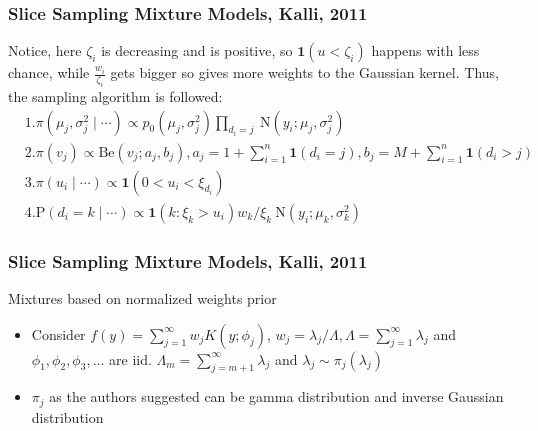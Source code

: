 \documentclass{beamer}
\begin{document}
\begin{frame}
    \frametitle{Slice Sampling Mixture Models, Kalli, 2011}
    Notice, here $\zeta_{i}$ is decreasing and is positive, so $\textbf{1}(u < \zeta_{i})$ happens with less chance, while $\frac{w_i}{\zeta_{i}}$ gets bigger so gives more weights to the Gaussian kernel. Thus, the sampling algorithm is followed:
    $$
    \begin{aligned}
    & 1. \pi\left(\mu_{j}, \sigma_{j}^{2} \mid \cdots\right) \propto p_{0}\left(\mu_{j}, \sigma_{j}^{2}\right) \prod_{d_{i}=j} \mathrm{~N}\left(y_{i} ; \mu_{j}, \sigma_{j}^{2}\right) \\
    & 2. \pi\left(v_{j}\right) \propto \mathrm{Be}\left(v_{j} ; a_{j}, b_{j}\right),  a_{j}=1+\sum_{i=1}^{n} \textbf{1}\left(d_{i}=j\right), b_{j}=M+\sum_{i=1}^{n} \textbf{1}\left(d_{i}>j\right) \\
    & 3. \pi\left(u_{i} \mid \cdots\right) \propto \textbf{1}\left(0<u_{i}<\xi_{d_{i}}\right) \\
    & 4. \mathrm{P}\left(d_{i}=k \mid \cdots\right) \propto \textbf{1}\left(k: \xi_{k}>u_{i}\right) w_{k} / \xi_{k} \mathrm{~N}\left(y_{i} ; \mu_{k}, \sigma_{k}^{2}\right)
    \end{aligned}
    $$
\end{frame}



\begin{frame}
    \frametitle{Slice Sampling Mixture Models, Kalli, 2011}
Mixtures based on normalized weights prior \\
    \begin{itemize}
    \item Consider $f(y)=\sum_{j=1}^{\infty} w_{j} K\left(y ; \phi_{j}\right)$,  $w_{j}=\lambda_{j} / \Lambda, \Lambda=\sum_{j=1}^{\infty} \lambda_{j}$ and $\phi_{1}, \phi_{2}, \phi_{3}, \ldots$ are iid.
    $\Lambda_{m}=\sum_{j=m+1}^{\infty} \lambda_{j}$ and $\lambda_{j} \sim \pi_{j}\left(\lambda_{j}\right)$
    \item  $\pi_j$ as the authors suggested can be gamma distribution and inverse Gaussian distribution
    \end{itemize}
\end{frame}
\end{document}
